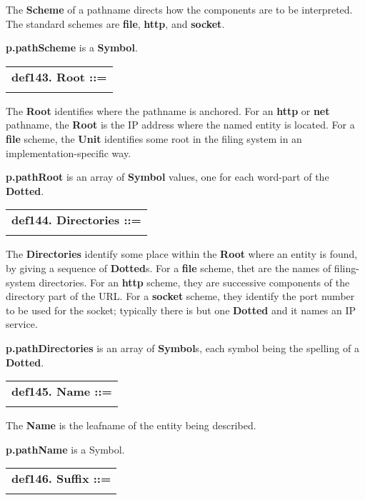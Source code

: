 \documentclass{report}
\begin{document}
The {\bf Scheme} of a pathname directs how the components are to be interpreted.
The standard schemes are {\bf file}, {\bf http}, and {\bf socket}.

{\bf p.pathScheme} is a {\bf Symbol}.

\begin{tabular}{l}
{\bf def143. Root ::= }\\ 
\hspace*{3mm}{\tt "//" Dotted} \\ 
\end{tabular}

The {\bf Root} identifies where the pathname is anchored. For an {\bf http} or {\bf net}
pathname, the {\bf Root} is the IP address where the named entity is located. For
a {\bf file} scheme, the {\bf Unit} identifies some root in the filing system in
an implementation-specific way.

{\bf p.pathRoot} is an array of {\bf Symbol} values, one for each word-part of the
{\bf Dotted}.

\begin{tabular}{l}
{\bf def144. Directories ::= }\\ 
\hspace*{3mm}{\tt {[}("/"){]} (Dotted "/")++} \\ 
\end{tabular}

The {\bf Directories} identify some place within the {\bf Root} where an entity is
found, by giving a sequence of {\bf Dotted}s. For a {\bf file} scheme, thet are the
names of filing-system directories. For an {\bf http} scheme, they are successive
components of the directory part of the URL. For a {\bf socket} scheme, they
identify the port number to be used for the socket; typically there is but one
{\bf Dotted} and it names an IP service.

{\bf p.pathDirectories} is an array of {\bf Symbol}s, each symbol being the spelling
of a {\bf Dotted}.

\begin{tabular}{l}
{\bf def145. Name ::= }\\ 
\hspace*{3mm}{\tt Word} \\ 
\end{tabular}

The {\bf Name} is the leafname of the entity being described.

{\bf p.pathName} is a Symbol.

\begin{tabular}{l}
{\bf def146. Suffix ::= }\\ 
\hspace*{3mm}{\tt "." Word} \\ 
\end{tabular}
\end{document}
